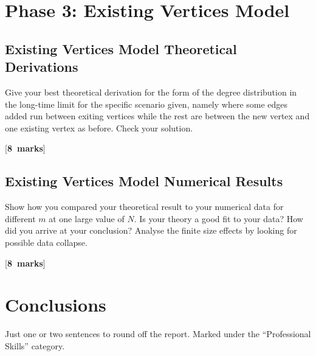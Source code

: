 \documentclass[a4paper,12pt]{article}
\newcounter{nmarks}
\newcommand{\qmarks}[1]{\addtocounter{nmarks}{#1} }
\renewcommand{\qmarks}[1]{\addtocounter{nmarks}{#1} \hspace*{\fill} [\textbf{#1~marks}]}
\begin{document}
\section{Phase 3: Existing Vertices Model}



\subsection{Existing Vertices Model Theoretical Derivations}

Give your best theoretical derivation for the form of the degree distribution in the long-time limit for the specific scenario given, namely where some edges added run between exiting vertices while the rest are between the new vertex and one existing vertex as before. Check your solution. \qmarks{8}

\subsection{Existing Vertices Model Numerical Results}

Show how you compared your theoretical result to your numerical data for different $m$ at one large value of $N$.  Is your theory a good fit to your data? How did you arrive at your conclusion?  
Analyse the finite size effects by looking for possible data collapse. 
\qmarks{8}

\section{Conclusions}\label{sconcl}

Just one or two sentences to round off the report. Marked under the ``Professional Skills'' category.



%
%

\vspace*{1cm}
\end{document}
